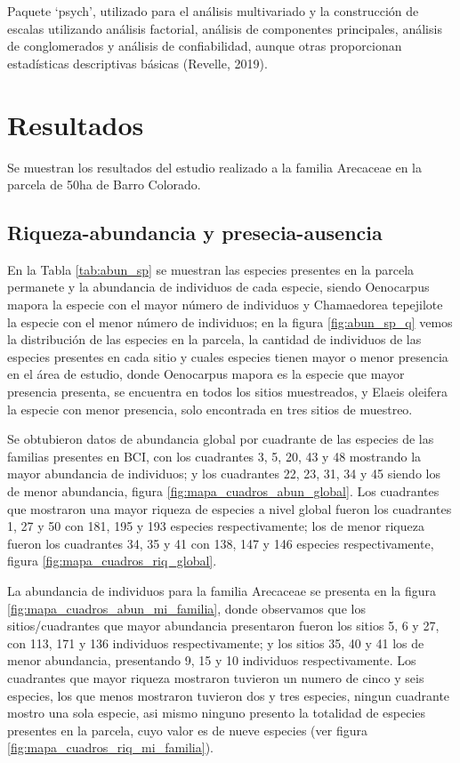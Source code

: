 \documentclass[11pt,]{article}
\begin{document}
Paquete `psych', utilizado para el análisis multivariado y la
construcción de escalas utilizando análisis factorial, análisis de
componentes principales, análisis de conglomerados y análisis de
confiabilidad, aunque otras proporcionan estadísticas descriptivas
básicas (Revelle, 2019).

\section{Resultados}\label{resultados}

Se muestran los resultados del estudio realizado a la familia Arecaceae
en la parcela de 50ha de Barro Colorado.

\subsection{Riqueza-abundancia y
presecia-ausencia}\label{riqueza-abundancia-y-presecia-ausencia}

En la Tabla \ref{tab:abun_sp} se muestran las especies presentes en la
parcela permanete y la abundancia de individuos de cada especie, siendo
Oenocarpus mapora la especie con el mayor número de individuos y
Chamaedorea tepejilote la especie con el menor número de individuos; en
la figura \ref{fig:abun_sp_q} vemos la distribución de las especies en
la parcela, la cantidad de individuos de las especies presentes en cada
sitio y cuales especies tienen mayor o menor presencia en el área de
estudio, donde Oenocarpus mapora es la especie que mayor presencia
presenta, se encuentra en todos los sitios muestreados, y Elaeis
oleifera la especie con menor presencia, solo encontrada en tres sitios
de muestreo.

Se obtubieron datos de abundancia global por cuadrante de las especies
de las familias presentes en BCI, con los cuadrantes 3, 5, 20, 43 y 48
mostrando la mayor abundancia de individuos; y los cuadrantes 22, 23,
31, 34 y 45 siendo los de menor abundancia, figura
\ref{fig:mapa_cuadros_abun_global}. Los cuadrantes que mostraron una
mayor riqueza de especies a nivel global fueron los cuadrantes 1, 27 y
50 con 181, 195 y 193 especies respectivamente; los de menor riqueza
fueron los cuadrantes 34, 35 y 41 con 138, 147 y 146 especies
respectivamente, figura \ref{fig:mapa_cuadros_riq_global}.

La abundancia de individuos para la familia Arecaceae se presenta en la
figura \ref{fig:mapa_cuadros_abun_mi_familia}, donde observamos que los
sitios/cuadrantes que mayor abundancia presentaron fueron los sitios 5,
6 y 27, con 113, 171 y 136 individuos respectivamente; y los sitios 35,
40 y 41 los de menor abundancia, presentando 9, 15 y 10 individuos
respectivamente. Los cuadrantes que mayor riqueza mostraron tuvieron un
numero de cinco y seis especies, los que menos mostraron tuvieron dos y
tres especies, ningun cuadrante mostro una sola especie, asi mismo
ninguno presento la totalidad de especies presentes en la parcela, cuyo
valor es de nueve especies (ver figura
\ref{fig:mapa_cuadros_riq_mi_familia}).
\end{document}
